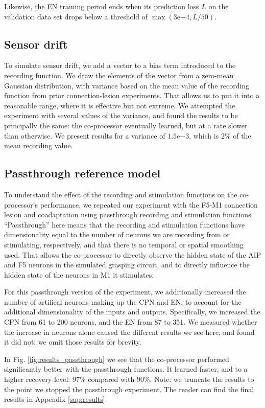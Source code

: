 \documentclass[12pt]{iopart}
\begin{document}
Likewise, the EN training period ends when its prediction loss $L$ on the validation data set drops
below a threshold of $\max(3\mathrm{e}{-4}, L/50)$.

\subsection{Sensor drift}
\label{sup:drift}
To simulate sensor drift, we add a vector to a bias term introduced to the recording function.
We draw the elements of the vector from a zero-mean Gaussian distribution, with variance based
on the mean value of the recording function from prior connection-lesion experiments. That
allows us to put it into a reasonable range, where it is effective but not extreme. We attempted
the experiment with several values of the variance, and found the results to be principally the same:
the co-processor eventually learned, but at a rate slower than otherwise. We present results for
a variance of $1.5\mathrm{e}{-3}$, which is $2\%$ of the mean recording value.

\subsection{Passthrough reference model}
\label{sup:passthrough}

To understand the effect of the recording and stimulation functions on the co-processor's performance, 
we repeated our experiment with the F5-M1 connection lesion and coadaptation using passthrough recording
and stimulation functions. ``Passthrough'' here means that the recording and stimulation functions have
dimensionality equal to the number of neurons we are recording from or stimulating, respectively, and that
there is no temporal or spatial smoothing used. That allows the co-processor to directly observe the hidden
state of the AIP and F5 neurons in the simulated grasping circuit, and to directly influence the hidden state
of the neurons in M1 it stimulates.

For this passthrough version of the experiment, we additionally increased the number of artifical neurons
making up the CPN and EN, to account for the additional dimensionality of the inputs and outputs. Specifically,
we increased the CPN from 61 to 200 neurons, and the EN from 87 to 351. We measured whether the increase in
neurons alone caused the different results we see here, and found it did not; we omit those results for
brevity.

In Fig. \ref{fig:results_passthrough} we see that the co-processor performed significantly better with
the passthrough functions. It learned faster, and to a higher recovery level: $97\%$ compared with $90\%$.
Note: we truncate the results to the point we stopped the passthrough experiment. The reader can find the
final results in Appendix \ref{sup:results}.
\end{document}
